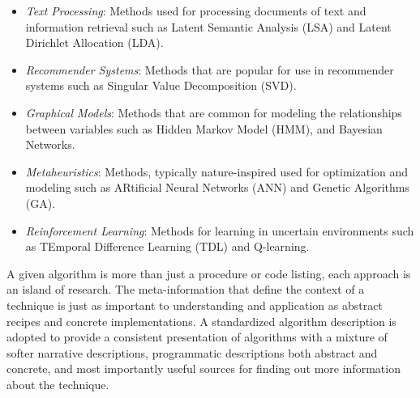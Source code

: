 \begin{itemize}
	\item \emph{Text Processing}: Methods used for processing documents of text and information retrieval such as Latent Semantic Analysis (LSA) and Latent Dirichlet Allocation (LDA).
	\item \emph{Recommender Systems}: Methods that are popular for use in recommender systems such as Singular Value Decomposition (SVD).
	\item \emph{Graphical Models}: Methods that are common for modeling the relationships between variables such as Hidden Markov Model (HMM), and Bayesian Networks.
	\item \emph{Metaheuristics}: Methods, typically nature-inspired used for optimization and modeling such as ARtificial Neural Networks (ANN) and Genetic Algorithms (GA).
	\item \emph{Reinforcement Learning}: Methods for learning in uncertain environments such as TEmporal Difference Learning (TDL) and Q-learning.
\end{itemize}

A given algorithm is more than just a procedure or code listing, each approach is an island of research. The meta-information that define the context of a technique is just as important to understanding and application as abstract recipes and concrete implementations. A standardized algorithm description is adopted to provide a consistent presentation of algorithms with a mixture of softer narrative descriptions, programmatic descriptions both abstract and concrete, and most importantly useful sources for finding out more information about the technique.


